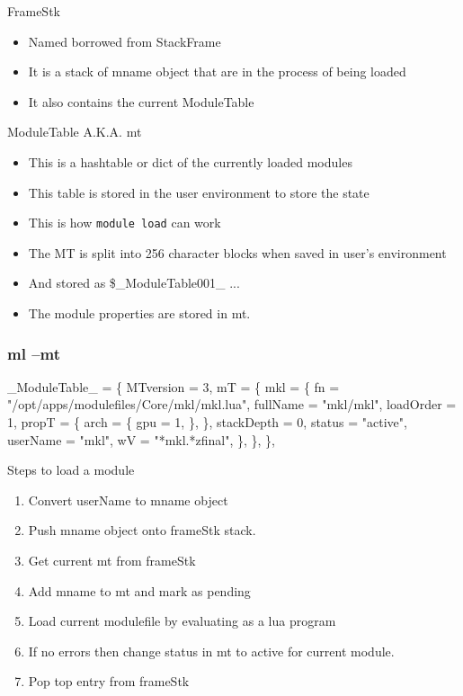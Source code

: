 \documentclass{beamer}
\begin{document}
\begin{frame}{FrameStk}
  \begin{itemize}
    \item Named borrowed from StackFrame 
    \item It is a stack of mname object that are in the process of
      being loaded
    \item It also contains the current ModuleTable
  \end{itemize}
\end{frame}

\begin{frame}{ModuleTable A.K.A. mt}
  \begin{itemize}
    \item This is a hashtable or dict of the currently loaded modules
    \item This table is stored in the user environment to store the
      state
    \item This is how {\color{blue}\texttt{module load}} can work
    \item The MT is split into 256 character blocks when saved in
      user's environment
    \item And stored as \$\_ModuleTable001\_ ...
    \item The module properties are stored in mt.
  \end{itemize}
\end{frame}

\begin{frame}[fragile]
  \frametitle{ml --mt}
    {\tiny
\begin{semiverbatim}
\_ModuleTable\_ = \{
  MTversion = 3,
  mT = \{
   mkl = \{
      fn = "/opt/apps/modulefiles/Core/mkl/mkl.lua",
      fullName = "mkl/mkl",
      loadOrder = 1,
      propT = \{
        arch = \{
          gpu = 1,
        \},
      \},
      stackDepth = 0,
      status = "active",
      userName = "mkl",
      wV = "*mkl.*zfinal",
    \},
  \},
\},
\end{semiverbatim}
    }
\end{frame}

\begin{frame}{Steps to load a module}
  \begin{enumerate}
    \item Convert userName to mname object
    \item Push mname object onto frameStk stack.
    \item Get current mt from frameStk
    \item Add mname to mt and mark as {\color{blue} pending}
    \item Load current modulefile by evaluating as a lua program
    \item If no errors then change status in mt to {\color{blue}
        active} for current module.
    \item Pop top entry from frameStk
  \end{enumerate}
\end{frame}
\end{document}
